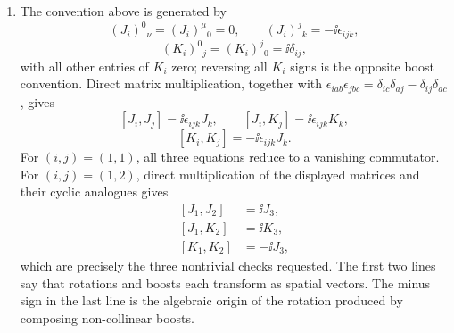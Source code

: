 \begin{enumerate}
\begin{enumerate}
\item
The convention above is generated by
\[
 (J_i)^0{}_\nu=(J_i)^\mu{}_0=0,\qquad
 (J_i)^j{}_k=-\ii\epsilon_{ijk},
\]
\[
 (K_i)^0{}_j=(K_i)^j{}_0=\ii\delta_{ij},
\]
with all other entries of \(K_i\) zero; reversing all \(K_i\) signs is the
opposite boost convention.  Direct matrix multiplication, together with
\(\epsilon_{iab}\epsilon_{jbc}
=\delta_{ic}\delta_{aj}-\delta_{ij}\delta_{ac}\), gives
\[
 [J_i,J_j]=\ii\epsilon_{ijk}J_k,\qquad
 [J_i,K_j]=\ii\epsilon_{ijk}K_k,
\]
\[
 [K_i,K_j]=-\ii\epsilon_{ijk}J_k.
\]
For \((i,j)=(1,1)\), all three equations reduce to a vanishing
commutator.  For \((i,j)=(1,2)\), direct multiplication of the displayed
matrices and their cyclic analogues gives
\[
\begin{split}
 [J_1,J_2]&=\ii J_3,\\
 [J_1,K_2]&=\ii K_3,\\
 [K_1,K_2]&=-\ii J_3,
\end{split}
\]
which are precisely the three nontrivial checks requested.  The first
two lines say that rotations and boosts each transform as spatial
vectors.  The minus sign in the last line is the algebraic origin of the
rotation produced by composing non-collinear boosts.
\end{enumerate}


\end{enumerate}
